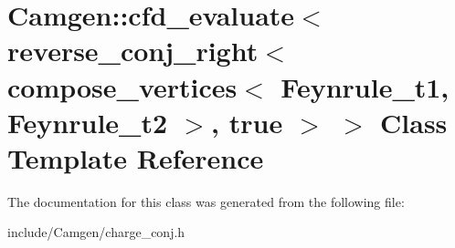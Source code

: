 \hypertarget{a00065}{\section{Camgen\-:\-:cfd\-\_\-evaluate$<$ reverse\-\_\-conj\-\_\-right$<$ compose\-\_\-vertices$<$ Feynrule\-\_\-t1, Feynrule\-\_\-t2 $>$, true $>$ $>$ Class Template Reference}
\label{a00065}
}


The documentation for this class was generated from the following file\-:\begin{DoxyCompactItemize}
\item 
include/\-Camgen/charge\-\_\-conj.\-h\end{DoxyCompactItemize}
